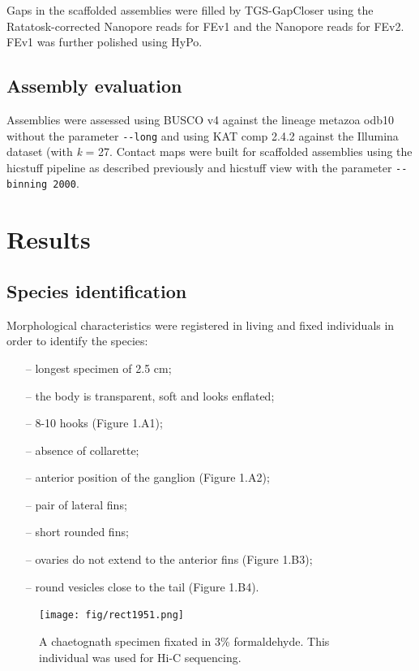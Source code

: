 Gaps in the scaffolded assemblies were filled by TGS-GapCloser \cite{tgsgapcloser} using the Ratatosk-corrected Nanopore reads for FEv1 and the Nanopore reads for FEv2. FEv1 was further polished using HyPo. 

\subsection{Assembly evaluation}

Assemblies were assessed using BUSCO v4 against the lineage metazoa odb10 without the parameter \texttt{-{}-long} and using KAT comp 2.4.2 against the Illumina dataset (with \textit{k} = 27. Contact maps were built for scaffolded assemblies using the hicstuff pipeline as described previously and hicstuff view with the parameter \texttt{-{}-binning 2000}.

\section{Results}

\subsection{Species identification}

Morphological characteristics were registered in living and fixed individuals in order to identify the species: 
\begin{itemize}
    \item[--] longest specimen of 2.5 cm;
    \item[--] the body is transparent, soft and looks enflated;
    \item[--] 8-10 hooks (Figure 1.A1);
    \item[--] absence of collarette;
    \item[--] anterior position of the ganglion (Figure 1.A2);
    \item[--] pair of lateral fins;
    \item[--] short rounded fins;
    \item[--] ovaries do not extend to the anterior fins (Figure 1.B3);
    \item[--] round vesicles close to the tail (Figure 1.B4).
\end{itemize}

\begin{figure}[H]
    \centering
    \texttt{[image: fig/rect1951.png]}
    \caption{A chaetognath specimen fixated in 3\% formaldehyde. This individual was used for Hi-C sequencing.}
\end{figure}

